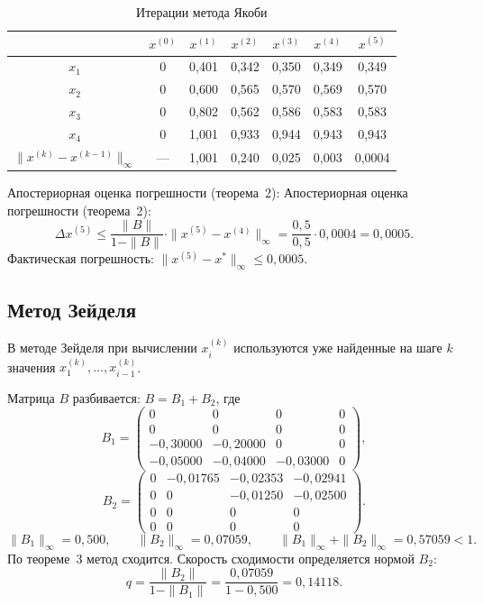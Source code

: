 \documentclass[a4paper, final]{article}
\begin{document}
\begin{table}[h!]
\centering
\caption{Итерации метода Якоби}
\label{tab:jacobi}
\renewcommand{\arraystretch}{1.3}
\begin{tabular}{|c|c|c|c|c|c|c|}
\hline
 & $x^{(0)}$ & $x^{(1)}$ & $x^{(2)}$ & $x^{(3)}$ & $x^{(4)}$ & $x^{(5)}$ \\
\hline
$x_1$ & 0 & 0,401 & 0,342 & 0,350 & 0,349 & 0,349 \\
$x_2$ & 0 & 0,600 & 0,565 & 0,570 & 0,569 & 0,570 \\
$x_3$ & 0 & 0,802 & 0,562 & 0,586 & 0,583 & 0,583 \\
$x_4$ & 0 & 1,001 & 0,933 & 0,944 & 0,943 & 0,943 \\
\hline
$\|x^{(k)}-x^{(k-1)}\|_\infty$ & --- & 1,001 & 0,240 & 0,025 & 0,003 & 0,0004 \\
\hline
\end{tabular}
\end{table}

Апостериорная оценка погрешности (теорема~2):
Апостериорная оценка погрешности (теорема~2):
\[
\Delta x^{(5)} \leq \frac{\|B\|}{1-\|B\|}\cdot\|x^{(5)}-x^{(4)}\|_\infty
= \frac{0{,}5}{0{,}5}\cdot 0{,}0004 = 0{,}0005.
\]
Фактическая погрешность: $\|x^{(5)}-x^*\|_\infty \leq 0{,}0005.$

\newpage

\subsection{Метод Зейделя}

В методе Зейделя при вычислении $x_i^{(k)}$ используются
уже найденные на шаге $k$ значения $x_1^{(k)},\ldots,x_{i-1}^{(k)}$.

Матрица $B$ разбивается: $B = B_1 + B_2$, где
\[
B_1 = \begin{pmatrix}
0          & 0          & 0          & 0 \\
0          & 0          & 0          & 0 \\
-0{,}30000 & -0{,}20000 & 0          & 0 \\
-0{,}05000 & -0{,}04000 & -0{,}03000 & 0
\end{pmatrix}, \] 
\[
B_2 = \begin{pmatrix}
0 & -0{,}01765 & -0{,}02353 & -0{,}02941 \\
0 & 0          & -0{,}01250 & -0{,}02500 \\
0 & 0          & 0          & 0          \\
0 & 0          & 0          & 0
\end{pmatrix}.
\]
\[
\|B_1\|_\infty = 0{,}500,\qquad \|B_2\|_\infty = 0{,}07059,\qquad
\|B_1\|_\infty+\|B_2\|_\infty = 0{,}57059 < 1.
\]
По теореме~3 метод сходится. Скорость сходимости определяется нормой $B_2$:
\[
q = \frac{\|B_2\|}{1-\|B_1\|} = \frac{0{,}07059}{1-0{,}500} = 0{,}14118.
\]
\end{document}
